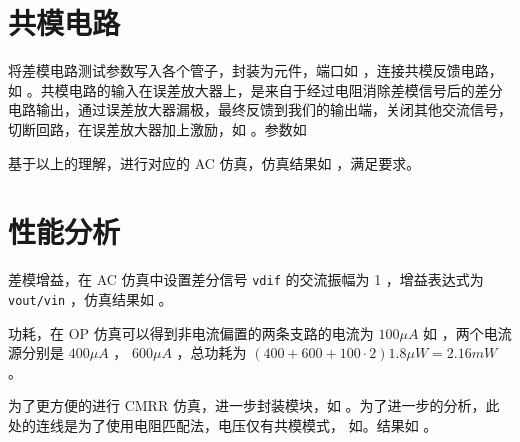 \documentclass[lang=cn,11pt,a4paper,cite=authoryear]{elegantpaper}
\begin{document}

\section{共模电路}

将差模电路测试参数写入各个管子，封装为元件，端口如  ，连接共模反馈电路，如  。共模电路的输入在误差放大器上，是来自于经过电阻消除差模信号后的差分电路输出，通过误差放大器漏极，最终反馈到我们的输出端，关闭其他交流信号，切断回路，在误差放大器加上激励，如 。参数如 




基于以上的理解，进行对应的 AC 仿真，仿真结果如  ，满足要求。


\section{性能分析}

差模增益，在 AC 仿真中设置差分信号 \lstinline{vdif} 的交流振幅为 1 ，增益表达式为 \lstinline{vout/vin} ，仿真结果如  。


功耗，在 OP 仿真可以得到非电流偏置的两条支路的电流为 \(100 \mu A\) 如 ，两个电流源分别是 \(400\mu A\) ， \(600 \mu A\) ，总功耗为 \((400 + 600 + 100 \cdot 2) 1.8 \mu W = 2.16 mW\) 。


为了更方便的进行 CMRR 仿真，进一步封装模块，如  。为了进一步的分析，此处的连线是为了使用电阻匹配法，电压仅有共模模式， 如。结果如  。









\end{document}
